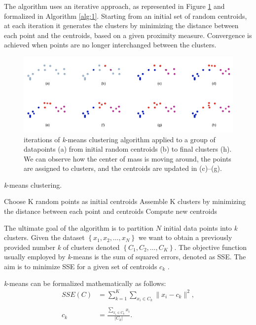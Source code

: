 \documentclass{usiinftr}
\begin{document}
The algorithm uses an iterative approach, as represented in Figure \ref{fig:1} and formalized in Algorithm \ref{alg:1}. Starting from an initial set of random centroids, at each iteration it generates the clusters by minimizing the distance between each point and the centroids, based on a given proximity measure. Convergence is achieved when points are no longer interchanged between the clusters.
\begin{figure}[h]
	\centering
	\includegraphics[scale=0.2]{./img/Kmeans_final}
	\caption{iterations of \textit{k}-means clustering algorithm applied to a group of datapoints (a) from initial random centroids (b) to final clusters (h). We can observe how the center of mass is moving around, the points are assigned to clusters, and the centroids are updated in (c)--(g).}
	\label{fig:1}
\end{figure}
\begin{algorithm}
	\caption{\textit{k}-means clustering.}\label{kmeans}
	\label{alg:1}
	\begin{algorithmic}[1]
		\State Choose K random points as initial centroids 
		\State Assemble K clusters by minimizing the distance between each point and centroids
		\State Compute new centroids
		\EndWhile
		\EndProcedure
	\end{algorithmic}
\end{algorithm}

The ultimate goal of the algorithm is to partition $N$ initial data points into \textit{k} clusters. Given the dataset $\left\lbrace x_1, x_2, \dots, x_N \right\rbrace$ we want to obtain a previously provided number \textit{k} of clusters denoted $\left\lbrace C_1, C_2, \dots, C_K \right\rbrace $. The objective function usually employed by \textit{k}-means is the sum of squared errors, denoted as SSE. The aim is to minimize SSE for a given set of centroids $c_k$ \cite{11}.

\textit{k}-means can be  formalized mathematically as follows: 
\begin{equation*}
\begin{split}
SSE(C) &= \sum_{k=1}^{K} \sum_{x_i \in C_k} \| x_i - c_k\|^2, \\ \\
c_k &= \frac{\sum\limits_{x_i \in C_k} x_i}{|C_k|}.
\end{split}
\end{equation*}
\end{document}
